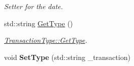 \begin{DoxyCompactItemize}
\begin{DoxyCompactList}\small\item\em Setter for the date. \end{DoxyCompactList}\item 
std\+::string \mbox{\hyperlink{class_transaction_type_a2253c4366ecd89e2f4d31888527e47dc}{Get\+Type}} ()
\begin{DoxyCompactList}\small\item\em \mbox{\hyperlink{class_transaction_type_a2253c4366ecd89e2f4d31888527e47dc}{Transaction\+Type\+::\+Get\+Type}}. \end{DoxyCompactList}\item 
\mbox{\label{class_transaction_type_a7b70a06b10c616b7f2151744a7367421}} 
void {\bfseries Set\+Type} (std\+::string \+\_\+transaction)
\end{DoxyCompactItemize}
